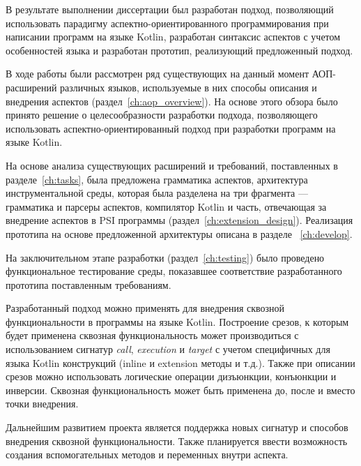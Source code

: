 \conclusion
В результате выполнении диссертации был разработан подход, позволяющий использовать парадигму аспектно-ориентированного программирования при написании программ на языке Kotlin, разработан синтаксис аспектов с учетом особенностей языка и разработан прототип, реализующий предложенный подход.

В ходе работы были рассмотрен ряд существующих на данный момент АОП-расширений различных языков, используемые в них способы описания и внедрения аспектов (раздел~\ref{ch:aop_overview}).
На основе этого обзора было принято решение о целесообразности разработки подхода, позволяющего использовать аспектно-ориентированный подход при разработки программ на языке Kotlin.

На основе анализа существующих расширений и требований, поставленных в
разделе~\ref{ch:tasks}, была предложена грамматика аспектов, архитектура инструментальной среды, которая была разделена на три фрагмента --- грамматика и парсеры аспектов, компилятор Kotlin и часть, отвечающая за внедрение аспектов в PSI программы (раздел~\ref{ch:extension_design}).
Реализация прототипа на основе предложенной архитектуры описана в разделе ~\ref{ch:develop}.

На заключительном этапе разработки (раздел~\ref{ch:testing}) было проведено
функциональное тестирование среды, показавшее соответствие разработанного прототипа поставленным требованиям.

Разработанный подход можно применять для внедрения сквозной функциональности в программы на языке Kotlin.
Построение срезов, к которым будет применена сквозная функциональность может производиться с использованием сигнатур \textit{call}, \textit{execution} и \textit{target} с учетом специфичных для языка Kotlin конструкций (inline и extension методы и т.д.).
Также при описании срезов можно использовать логические операции дизъюнкции, конъюнкции и инверсии.
Сквозная функциональность может быть применена до, после и вместо точки внедрения.

Дальнейшим развитием проекта является поддержка новых сигнатур и способов внедрения сквозной функциональности.
Также планируется ввести возможность создания вспомогательных методов и переменных внутри аспекта.